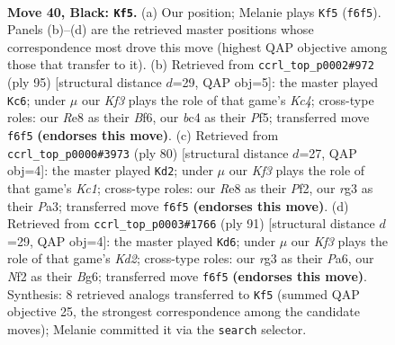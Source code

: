 \documentclass[11pt]{article}
\begin{document}
\clearpage

\begin{figure}[p]\centering
\begin{subfigure}{0.46\textwidth}\centering
\resizebox{\linewidth}{!}{%
\newchessgame
\chessboard[
  setfen={4r3/pb1p4/5k2/8/2B5/6R1/PPK2n2/2B5 b - - 1 40},
  showmover=false,
  pgfstyle=straightmove, color=movearrow, markmove={f6-f5}
]}
\caption{}
\end{subfigure}\hfill
\begin{subfigure}{0.46\textwidth}\centering
\resizebox{\linewidth}{!}{%
\newchessgame
\chessboard[
  setfen={8/8/5bp1/2k2p2/P1p5/8/4KPP1/4B3 b - - 2 48},
  showmover=false,
  pgfstyle=straightmove, color=movearrow, markmove={c5-c6}
]}
\caption{}
\end{subfigure}
\\[4pt]
\begin{subfigure}{0.46\textwidth}\centering
\resizebox{\linewidth}{!}{%
\newchessgame
\chessboard[
  setfen={4b3/6R1/4kn2/1p2p3/7P/P7/5P2/2K5 w - - 6 41},
  showmover=false,
  pgfstyle=straightmove, color=movearrow, markmove={c1-d2}
]}
\caption{}
\end{subfigure}\hfill
\begin{subfigure}{0.46\textwidth}\centering
\resizebox{\linewidth}{!}{%
\newchessgame
\chessboard[
  setfen={8/3k4/p5b1/3n4/P1pB4/8/2P5/2KB4 b - - 1 46},
  showmover=false,
  pgfstyle=straightmove, color=movearrow, markmove={d7-d6}
]}
\caption{}
\end{subfigure}
\caption{\textbf{Move 40, Black: \texttt{Kf5}.} (a) Our position; Melanie plays \texttt{Kf5} (\texttt{f6f5}). Panels (b)--(d) are the retrieved master positions whose correspondence most drove this move (highest QAP objective among those that transfer to it). (b) Retrieved from \texttt{ccrl\_top\_p0002\#972} (ply 95) [structural distance $d$=29, QAP obj=5]: the master played \texttt{Kc6}; under $\mu$ our \emph{Kf3} plays the role of that game's \emph{Kc4}; cross-type roles: our \emph{R}e8 as their \emph{B}f6, our \emph{b}c4 as their \emph{P}f5; transferred move \texttt{f6f5} \textbf{(endorses this move)}. (c) Retrieved from \texttt{ccrl\_top\_p0000\#3973} (ply 80) [structural distance $d$=27, QAP obj=4]: the master played \texttt{Kd2}; under $\mu$ our \emph{Kf3} plays the role of that game's \emph{Kc1}; cross-type roles: our \emph{R}e8 as their \emph{P}f2, our \emph{r}g3 as their \emph{P}a3; transferred move \texttt{f6f5} \textbf{(endorses this move)}. (d) Retrieved from \texttt{ccrl\_top\_p0003\#1766} (ply 91) [structural distance $d$=29, QAP obj=4]: the master played \texttt{Kd6}; under $\mu$ our \emph{Kf3} plays the role of that game's \emph{Kd2}; cross-type roles: our \emph{r}g3 as their \emph{P}a6, our \emph{N}f2 as their \emph{B}g6; transferred move \texttt{f6f5} \textbf{(endorses this move)}. Synthesis: 8 retrieved analogs transferred to \texttt{Kf5} (summed QAP objective 25, the strongest correspondence among the candidate moves); Melanie committed it via the \texttt{search} selector.}
\label{fig:thought-m79}
\end{figure}
\end{document}
